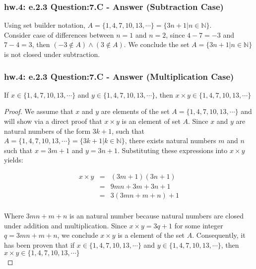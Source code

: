 \subsubsection*{hw.4: e.2.3 Question:7.C - Answer (Subtraction Case)}
Using set builder notation, $A = \{1, 4, 7, 10, 13, \cdots \} = \{ 3n + 1 | n \in \mathbb{N} \}$. \\
Consider case of differences between $n=1$ and $n=2$, since $4-7 = -3$ and $7-4 = 3$, then $(-3 \notin A) \wedge (3 \notin A)$. We conclude the set $A = \{ 3n + 1 | n \in \mathbb{N} \}$ is not closed under subtraction. \\

\newpage
\subsubsection*{hw.4: e.2.3 Question:7.C - Answer (Multiplication Case)}
\begin{tcolorbox}
\begin{theorem}
If $x \in \{1, 4, 7, 10, 13, \cdots \}$ and $y \in \{1, 4, 7, 10, 13, \cdots \}$, then $x \times y \in \{1, 4, 7, 10, 13, \cdots \}$
\end{theorem}
\end{tcolorbox}

\begin{proof}
We assume that $x$ and $y$ are elements of the set $A = \{1, 4, 7, 10, 13, \cdots \}$ and will show via a direct proof that $x \times y$ is an element of set $A$. Since $x$ and $y$ are natural numbers of the form $3k + 1$, such that $A = \{1, 4, 7, 10, 13, \cdots \} = \{ 3k + 1 | k \in \mathbb{N} \}$, there exists natural numbers $m$ and $n$ such that $x = 3m + 1$ and $y = 3n + 1$. Substituting these expressions into $x \times y$ yields:

\begin{eqnarray*}
x \times y & = & (3m + 1)(3n + 1) \nonumber \\
& = & 9mn + 3m + 3n + 1 \nonumber \\
& = & 3(3mn + m + n) + 1 \nonumber \\
\end{eqnarray*}

Where $3mn + m + n$ is an natural number because natural numbers are closed under addition and multiplication. Since $x \times y = 3q + 1$ for some integer $q = 3mn + m + n$, we conclude $x \times y$ is a element of the set $A$. Consequently, it has been proven that if $x \in \{1, 4, 7, 10, 13, \cdots \}$ and $y \in \{1, 4, 7, 10, 13, \cdots \}$, then $x \times y \in \{1, 4, 7, 10, 13, \cdots \}$ \\
\end{proof}


